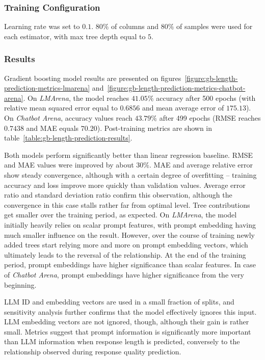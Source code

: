 \documentclass[a4paper,11pt,twoside]{report}
\theoremstyle{definition}
\begin{document}
\subsubsection{Training Configuration}

Learning rate was set to $0.1$. $80 \%$ of columns and $80 \%$ of samples were used for each estimator, with max tree depth equal to $5$.

\subsubsection{Results}

Gradient boosting model results are presented on figures~\ref{figure:gb-length-prediction-metrics-lmarena} and~\ref{figure:gb-length-prediction-metrics-chatbot-arena}. On \textit{LMArena}, the model reaches $41.05 \%$ accuracy after 500 epochs (with relative mean squared error equal to $0.6856$ and mean average error of $175.13$). On \textit{Chatbot Arena}, accuracy values reach $43.79 \%$ after 499 epochs (RMSE reaches $0.7438$ and MAE equals $70.20$). Post-training metrics are shown in table~\ref{table:gb-length-prediction-results}.

Both models perform significantly better than linear regression baseline. RMSE and MAE values were improved by about $30 \%$. MAE and average relative error show steady convergence, although with a certain degree of overfitting -- training accuracy and loss improve more quickly than validation values. Average error ratio and standard deviation ratio confirm this observation, although the convergence in this case stalls rather far from optimal level. Tree contributions get smaller over the training period, as expected. On \textit{LMArena}, the model initially heavily relies on scalar prompt features, with prompt embedding having much smaller influence on the result. However, over the course of training newly added trees start relying more and more on prompt embedding vectors, which ultimately leads to the reversal of the relationship. At the end of the training period, prompt embeddings have higher significance than scalar features. In case of \textit{Chatbot Arena}, prompt embeddings have higher significance from the very beginning.

LLM ID and embedding vectors are used in a small fraction of splits, and sensitivity analysis further confirms that the model effectively ignores this input. LLM embedding vectors are not ignored, though, although their gain is rather small. Metrics suggest that prompt information is significantly more important than LLM information when response length is predicted, conversely to the relationship observed during response quality prediction.
\end{document}
